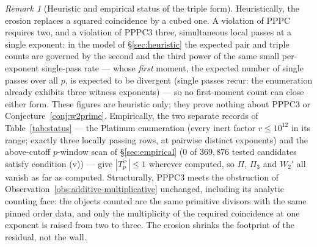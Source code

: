 \documentclass[11pt]{amsart}
\theoremstyle{plain}
\theoremstyle{definition}
\theoremstyle{remark}
\newtheorem{remark}[theorem]{Remark}
\numberwithin{equation}{section}
\begin{document}
\begin{remark}[Heuristic and empirical status of the triple form]\label{rem:triple-status}
Heuristically, the erosion replaces a squared coincidence by a cubed one. A violation of PPPC requires two, and a violation of PPPC3 three, simultaneous local passes at a single exponent: in the model of \S\ref{sec:heuristic} the expected pair and triple counts are governed by the second and the third power of the same small per-exponent single-pass rate --- whose \emph{first} moment, the expected number of single passes over all $p$, is expected to be divergent (single passes recur: the enumeration already exhibits three witness exponents) --- so no first-moment count can close either form. These figures are heuristic only; they prove nothing about PPPC3 or Conjecture~\ref{conj:w2prime}. Empirically, the two separate records of Table~\ref{tab:status} --- the Platinum enumeration (every inert factor $r \leq 10^{12}$ in its range; exactly three locally passing rows, at pairwise distinct exponents) and the above-cutoff $p$-window scan of \S\ref{sec:empirical} ($0$ of $369{,}876$ tested candidates satisfy condition (v)) --- give $|T_p^{>}| \leq 1$ wherever computed, so $\Pi$, $\Pi_3$ and $W_2'$ all vanish as far as computed. Structurally, PPPC3 meets the obstruction of Observation~\ref{obs:additive-multiplicative} unchanged, including its analytic counting face: the objects counted are the same primitive divisors with the same pinned order data, and only the multiplicity of the required coincidence at one exponent is raised from two to three. The erosion shrinks the footprint of the residual, not the wall.
\end{remark}
\end{document}
